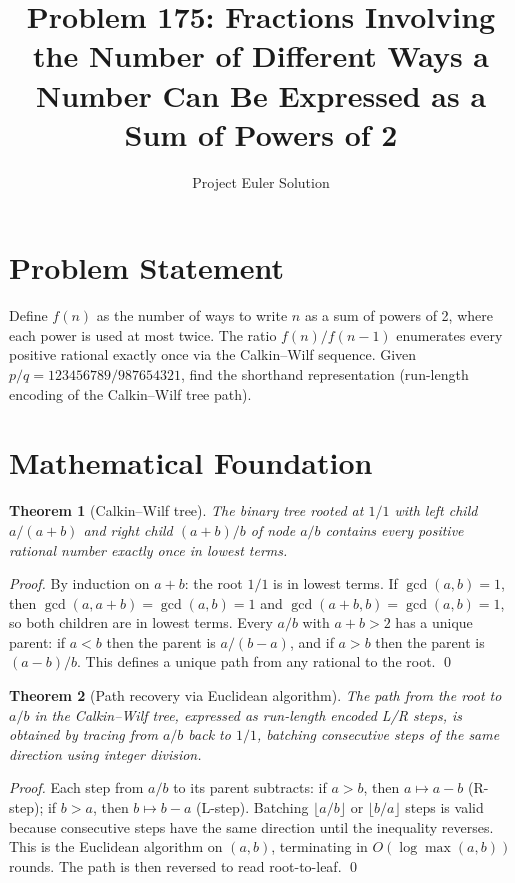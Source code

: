 \documentclass[11pt]{article}
\title{Problem 175: Fractions Involving the Number of Different Ways a Number Can Be Expressed as a Sum of Powers of 2}
\author{Project Euler Solution}
\date{}
\newtheorem{theorem}{Theorem}
\begin{document}
\maketitle

\section{Problem Statement}

Define $f(n)$ as the number of ways to write $n$ as a sum of powers of 2, where each power is used at most twice. The ratio $f(n)/f(n-1)$ enumerates every positive rational exactly once via the Calkin--Wilf sequence. Given $p/q = 123456789/987654321$, find the shorthand representation (run-length encoding of the Calkin--Wilf tree path).

\section{Mathematical Foundation}

\begin{theorem}[Calkin--Wilf tree]
The binary tree rooted at $1/1$ with left child $a/(a+b)$ and right child $(a+b)/b$ of node $a/b$ contains every positive rational number exactly once in lowest terms.
\end{theorem}

\begin{proof}
By induction on $a + b$: the root $1/1$ is in lowest terms. If $\gcd(a, b) = 1$, then $\gcd(a, a+b) = \gcd(a, b) = 1$ and $\gcd(a+b, b) = \gcd(a, b) = 1$, so both children are in lowest terms. Every $a/b$ with $a + b > 2$ has a unique parent: if $a < b$ then the parent is $a/(b-a)$, and if $a > b$ then the parent is $(a-b)/b$. This defines a unique path from any rational to the root. \qed
\end{proof}

\begin{theorem}[Path recovery via Euclidean algorithm]
The path from the root to $a/b$ in the Calkin--Wilf tree, expressed as run-length encoded L/R steps, is obtained by tracing from $a/b$ back to $1/1$, batching consecutive steps of the same direction using integer division.
\end{theorem}

\begin{proof}
Each step from $a/b$ to its parent subtracts: if $a > b$, then $a \mapsto a - b$ (R-step); if $b > a$, then $b \mapsto b - a$ (L-step). Batching $\lfloor a/b \rfloor$ or $\lfloor b/a \rfloor$ steps is valid because consecutive steps have the same direction until the inequality reverses. This is the Euclidean algorithm on $(a, b)$, terminating in $O(\log \max(a, b))$ rounds. The path is then reversed to read root-to-leaf. \qed
\end{proof}
\end{document}
